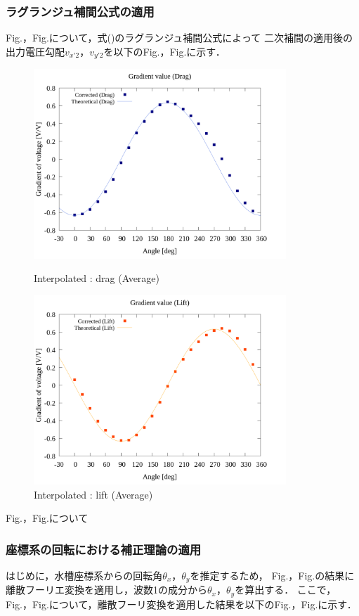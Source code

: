 \subsubsection{ラグランジュ補間公式の適用}
Fig.，Fig.について，式()のラグランジュ補間公式によって
二次補間の適用後の出力電圧勾配$v_{x'2}$，$v_{y'2}$を以下のFig.，Fig.に示す．

\begin{figure}[htbp]
		\centering
		\includegraphics[width=95mm]{../../02_workspace/result/2-ex/plot/21/21-3_interpolated_drag.png}
		\caption{Interpolated : drag (Average)}
		\includegraphics[width=95mm]{../../02_workspace/result/2-ex/plot/21/21-3_interpolated_lift.png}
		\caption{Interpolated : lift (Average)}
\end{figure}

\newpage

Fig.，Fig.について

\subsubsection{座標系の回転における補正理論の適用}
はじめに，水槽座標系からの回転角$\theta_x$，$\theta_y$を推定するため，
Fig.，Fig.の結果に離散フーリエ変換を適用し，波数1の成分から$\theta_x$，$\theta_y$を算出する．
ここで，Fig.，Fig.について，離散フーリ変換を適用した結果を以下のFig.，Fig.に示す．

